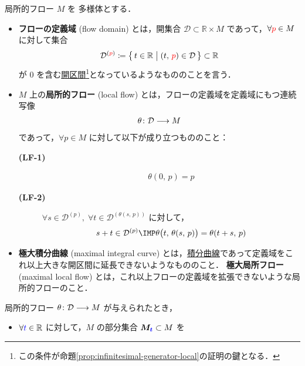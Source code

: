 \documentclass[TQFT_main]{subfiles}
\begin{document}
\begin{mydef}[label=def:local-flow, breakable]{局所的フロー}
    $M$ を \cinfty 多様体とする．
    \begin{itemize}
        \item \textbf{フローの定義域} (flow domain) とは，開集合 $\bm{\mathcal{D}} \subset \mathbb{R} \times M$ であって，$\forall \textcolor{red}{p} \in M$ に対して集合
        \begin{align}
            \mathcal{D}^{(\textcolor{red}{p})} \coloneqq \bigl\{\, t \in \mathbb{R} \bigm| (t,\, \textcolor{red}{p}) \in \mathcal{D} \,\bigr\}  \subset \mathbb{R}
        \end{align}
        が $0$ を含む\underline{開区間}\footnote{この条件が命題\ref{prop:infinitesimal-generator-local}の証明の鍵となる．}となっているようなもののことを言う．
        \item $M$ 上の\textbf{局所的フロー} (local flow) とは，フローの定義域を定義域にもつ連続写像
        \begin{align}
            \theta \colon \mathcal{D} \longrightarrow M
        \end{align}
        であって，$\forall p \in M$ に対して以下が成り立つもののこと：
        \begin{description}
            \item[\textbf{(LF-1)}]  
            \begin{align}
                \theta (0,\, p) = p
            \end{align}
            \item[\textbf{(LF-2)}] $\forall s \in \mathcal{D}^{(p)},\; \forall t \in \mathcal{D}^{(\theta(s,\, p))}$ に対して，
            \begin{align}
                s + t \in \mathcal{D}^{(p)} \IMP \theta \bigl( t,\, \theta(s,\, p) \bigr)  = \theta(t + s,\, p)
            \end{align}
        \end{description}
        \item \textbf{極大積分曲線} (maximal integral curve) とは，\hyperref[def:integral-curve]{積分曲線}であって定義域をこれ以上大きな開区間に延長できないようなもののこと．
        \textbf{極大局所フロー} (maximal local flow) とは，これ以上フローの定義域を拡張できないような局所的フローのこと．
    \end{itemize}
    \tcblower
    局所的フロー $\theta \colon \mathcal{D} \longrightarrow M$ が与えられたとき，
    \begin{itemize}
        \item $\forall \textcolor{blue}{t} \in \mathbb{R}$ に対して，$M$ の部分集合 $\bm{M_{\textcolor{blue}{t}}} \subset M$ を

\end{itemize}
\end{mydef}
\end{document}
